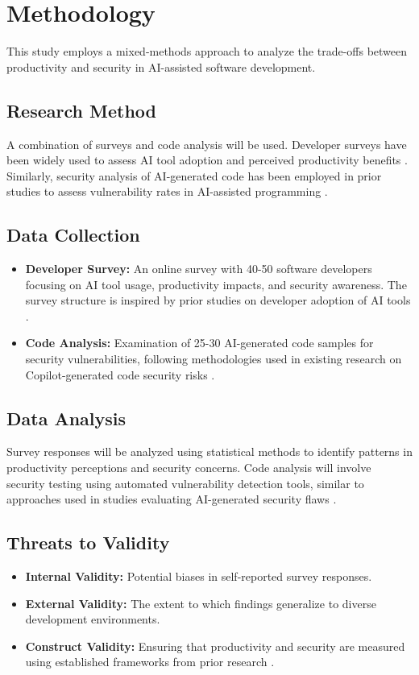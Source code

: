 \section{Methodology}
This study employs a mixed-methods approach to analyze the trade-offs between productivity and security in AI-assisted software development.

\subsection{Research Method}
A combination of surveys and code analysis will be used. Developer surveys have been widely used to assess AI tool adoption and perceived productivity benefits \cite{developer-adoption, snyk2023}. Similarly, security analysis of AI-generated code has been employed in prior studies to assess vulnerability rates in AI-assisted programming \cite{fu2023, perry2023, asare2024}.

\subsection{Data Collection}
\begin{itemize}
    \item \textbf{Developer Survey:} An online survey with 40-50 software developers focusing on AI tool usage, productivity impacts, and security awareness. The survey structure is inspired by prior studies on developer adoption of AI tools \cite{developer-adoption, snyk2023}.
    \item \textbf{Code Analysis:} Examination of 25-30 AI-generated code samples for security vulnerabilities, following methodologies used in existing research on Copilot-generated code security risks \cite{fu2023, asare2024}.
\end{itemize}

\subsection{Data Analysis}
Survey responses will be analyzed using statistical methods to identify patterns in productivity perceptions and security concerns. Code analysis will involve security testing using automated vulnerability detection tools, similar to approaches used in studies evaluating AI-generated security flaws \cite{fu2023, perry2023}.

\subsection{Threats to Validity}
\begin{itemize}
    \item \textbf{Internal Validity:} Potential biases in self-reported survey responses.
    \item \textbf{External Validity:} The extent to which findings generalize to diverse development environments.
    \item \textbf{Construct Validity:} Ensuring that productivity and security are measured using established frameworks from prior research \cite{developer-adoption, fu2023}.
\end{itemize}
